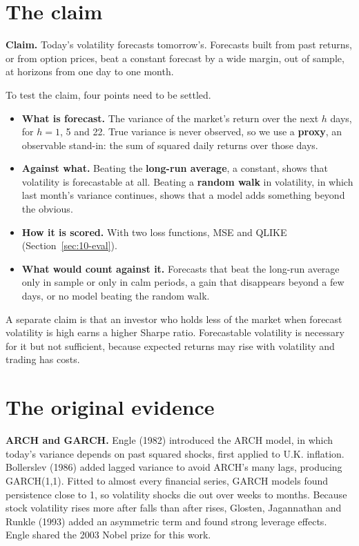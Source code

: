 \section{The claim}
\label{sec:10-claim}

\begin{callout}
\textbf{Claim.} Today's volatility forecasts tomorrow's. Forecasts built from past returns, or from option prices, beat a constant forecast by a wide margin, out of sample, at horizons from one day to one month.
\end{callout}

To test the claim, four points need to be settled.

\begin{itemize}
  \item \textbf{What is forecast.} The variance of the market's return over the next $h$ days, for $h = 1$, 5 and 22. True variance is never observed, so we use a \textbf{proxy}, an observable stand-in: the sum of squared daily returns over those days.
  \item \textbf{Against what.} Beating the \textbf{long-run average}, a constant, shows that volatility is forecastable at all. Beating a \textbf{random walk} in volatility, in which last month's variance continues, shows that a model adds something beyond the obvious.
  \item \textbf{How it is scored.} With two loss functions, MSE and QLIKE (Section~\ref{sec:10-eval}).
  \item \textbf{What would count against it.} Forecasts that beat the long-run average only in sample or only in calm periods, a gain that disappears beyond a few days, or no model beating the random walk.
\end{itemize}

A separate claim is that an investor who holds less of the market when forecast volatility is high earns a higher Sharpe ratio. Forecastable volatility is necessary for it but not sufficient, because expected returns may rise with volatility and trading has costs.

\section{The original evidence}
\label{sec:10-evidence}

\textbf{ARCH and GARCH.} Engle (1982) introduced the ARCH model, in which today's variance depends on past squared shocks, first applied to U.K. inflation. Bollerslev (1986) added lagged variance to avoid ARCH's many lags, producing GARCH(1,1). Fitted to almost every financial series, GARCH models found persistence close to 1, so volatility shocks die out over weeks to months. Because stock volatility rises more after falls than after rises, Glosten, Jagannathan and Runkle (1993) added an asymmetric term and found strong leverage effects. Engle shared the 2003 Nobel prize for this work.

